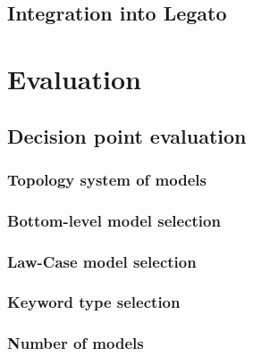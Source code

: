 \documentclass[
  digital, %
  table,   %
  lof,     %
  lot,     %
]{fithesis3}
\begin{document}
\section{Integration into Legato}

\chapter{Evaluation}
\label{chp:evaluation}

\section{Decision point evaluation}

\subsection{Topology system of models}

\subsection{Bottom-level model selection}
\label{eval:bottom-model-selection}

\subsection{Law-Case model selection}
\label{eval:law-case-model-selection}

\subsection{Keyword type selection}

\subsection{Number of models}
\label{eval:allinone-vs-features}
\end{document}
